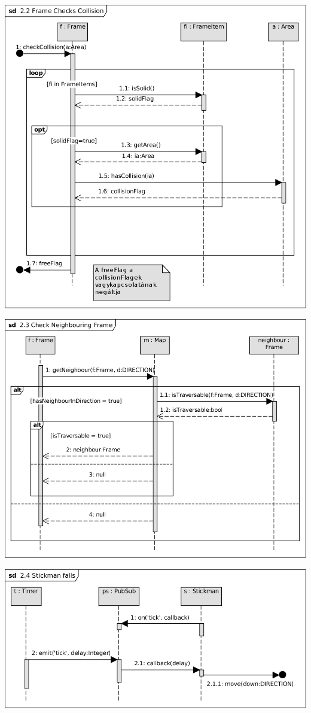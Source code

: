 \begin{center}\includegraphics[scale=1]{resources/22FrameChecksCollision.png}\end{center}
\begin{center}\includegraphics[scale=1]{resources/23CheckNeighbouringFrame.png}\end{center}
\begin{center}\includegraphics[scale=1]{resources/24Stickmanfalls.png}\end{center}
